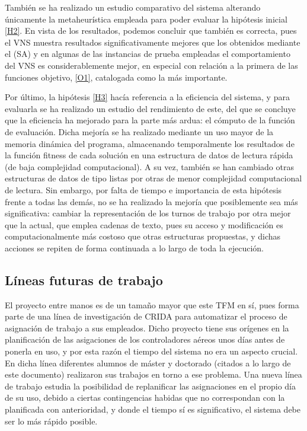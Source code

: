 También se ha realizado un estudio comparativo del sistema alterando únicamente la metaheurística empleada para poder evaluar la hipótesis inicial \ref{H2}. En vista de los resultados, podemos concluir que también es correcta, pues el VNS muestra resultados significativamente mejores que los obtenidos mediante el \sa{} (SA) y en algunas de las instancias de prueba empleadas el comportamiento del VNS es considerablemente mejor, en especial con relación a la primera de las funciones objetivo, \ref{O1}, catalogada como la más importante.

Por último, la hipótesis \ref{H3} hacía referencia a la eficiencia del sistema, y para evaluarla se ha realizado un estudio del rendimiento de este, del que se concluye que la eficiencia ha mejorado para la parte más ardua: el cómputo de la función de evaluación. Dicha mejoría se ha realizado mediante un uso mayor de la memoria dinámica del programa, almacenando temporalmente los resultados de la función fitness de cada solución en una estructura de datos de lectura rápida (de baja complejidad computacional). A su vez, también se han cambiado otras estructuras de datos de tipo listas por otras de menor complejidad computacional de lectura. Sin embargo, por falta de tiempo e importancia de esta hipótesis frente a todas las demás, no se ha realizado la mejoría que posiblemente sea más significativa: cambiar la representación de los turnos de trabajo por otra mejor que la actual, que emplea cadenas de texto, pues su acceso y modificación es computacionalmente más costoso que otras estructuras propuestas, y dichas acciones se repiten de forma continuada a lo largo de toda la ejecución.

\subsection{Líneas futuras de trabajo}
\label{sec:6:trabajo-futuro}

El proyecto entre manos es de un tamaño mayor que este TFM en sí, pues forma parte de una línea de investigación de \gls{CRIDA} para automatizar el proceso de asignación de trabajo a sus empleados. Dicho proyecto tiene sus orígenes en la planificación de las asigaciones de los controladores aéreos unos días antes de ponerla en uso, y por esta razón el tiempo del sistema no era un aspecto crucial. En dicha línea diferentes alumnos de máster y doctorado (citados a lo largo de este documento) realizaron sus trabajos en torno a ese problema. Una nueva línea de trabajo estudia la posibilidad de replanificar las asignaciones en el propio día de su uso, debido a ciertas contingencias habidas que no correspondan con la planificada con anterioridad, y donde el tiempo sí es significativo, el sistema debe ser lo más rápido posible.
%

